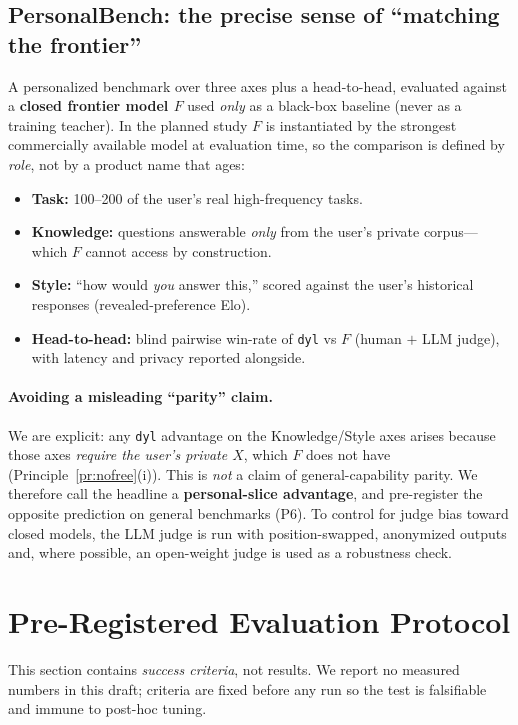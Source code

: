 \documentclass[11pt]{article}
\begin{document}
\subsection{PersonalBench: the precise sense of ``matching the frontier''}
\label{sec:bench}
A personalized benchmark over three axes plus a head-to-head, evaluated against a \textbf{closed frontier model $F$} used \emph{only} as a black-box baseline (never as a training teacher). In the planned study $F$ is instantiated by the strongest commercially available model at evaluation time, so the comparison is defined by \emph{role}, not by a product name that ages:
\begin{itemize}
  \item \textbf{Task:} 100--200 of the user's real high-frequency tasks.
  \item \textbf{Knowledge:} questions answerable \emph{only} from the user's private corpus---which $F$ cannot access by construction.
  \item \textbf{Style:} ``how would \emph{you} answer this,'' scored against the user's historical responses (revealed-preference Elo).
  \item \textbf{Head-to-head:} blind pairwise win-rate of \texttt{dyl} vs $F$ (human $+$ LLM judge), with latency and privacy reported alongside.
\end{itemize}
\paragraph{Avoiding a misleading ``parity'' claim.} We are explicit: any \texttt{dyl} advantage on the Knowledge/Style axes arises because those axes \emph{require the user's private $X$}, which $F$ does not have (Principle~\ref{pr:nofree}(i)). This is \emph{not} a claim of general-capability parity. We therefore call the headline a \textbf{personal-slice advantage}, and pre-register the opposite prediction on general benchmarks (P6). To control for judge bias toward closed models, the LLM judge is run with position-swapped, anonymized outputs and, where possible, an open-weight judge is used as a robustness check.

\section{Pre-Registered Evaluation Protocol}
\label{sec:protocol}
This section contains \emph{success criteria}, not results. We report no measured numbers in this draft; criteria are fixed before any run so the test is falsifiable and immune to post-hoc tuning.
\end{document}
